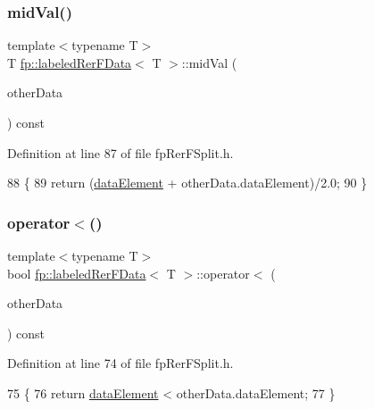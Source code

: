 \subsubsection{\texorpdfstring{mid\+Val()}{midVal()}}
{\footnotesize\ttfamily template$<$typename T$>$ \\
T \hyperlink{classfp_1_1labeledRerFData}{fp\+::labeled\+Rer\+F\+Data}$<$ T $>$\+::mid\+Val (\begin{DoxyParamCaption}\item[{const \hyperlink{classfp_1_1labeledRerFData}{labeled\+Rer\+F\+Data}$<$ T $>$ \&}]{other\+Data }\end{DoxyParamCaption}) const\hspace{0.3cm}{\ttfamily [inline]}}



Definition at line 87 of file fp\+Rer\+F\+Split.\+h.


\begin{DoxyCode}
88                 \{
89                     \textcolor{keywordflow}{return} (\hyperlink{classfp_1_1labeledRerFData_ace341f012e4e282c5a926ccb62246e84}{dataElement} + otherData.dataElement)/2.0;
90                 \}
\end{DoxyCode}
\mbox{\label{classfp_1_1labeledRerFData_a1df20c9fe02d55ba60210ec2a32721f1}} 
\subsubsection{\texorpdfstring{operator$<$()}{operator<()}}
{\footnotesize\ttfamily template$<$typename T$>$ \\
bool \hyperlink{classfp_1_1labeledRerFData}{fp\+::labeled\+Rer\+F\+Data}$<$ T $>$\+::operator$<$ (\begin{DoxyParamCaption}\item[{const \hyperlink{classfp_1_1labeledRerFData}{labeled\+Rer\+F\+Data}$<$ T $>$ \&}]{other\+Data }\end{DoxyParamCaption}) const\hspace{0.3cm}{\ttfamily [inline]}}



Definition at line 74 of file fp\+Rer\+F\+Split.\+h.


\begin{DoxyCode}
75                 \{
76                     \textcolor{keywordflow}{return} \hyperlink{classfp_1_1labeledRerFData_ace341f012e4e282c5a926ccb62246e84}{dataElement} < otherData.dataElement;
77                 \}
\end{DoxyCode}
\mbox{\label{classfp_1_1labeledRerFData_adb2f827456257e754cb1ab2a497a1d6e}} 
